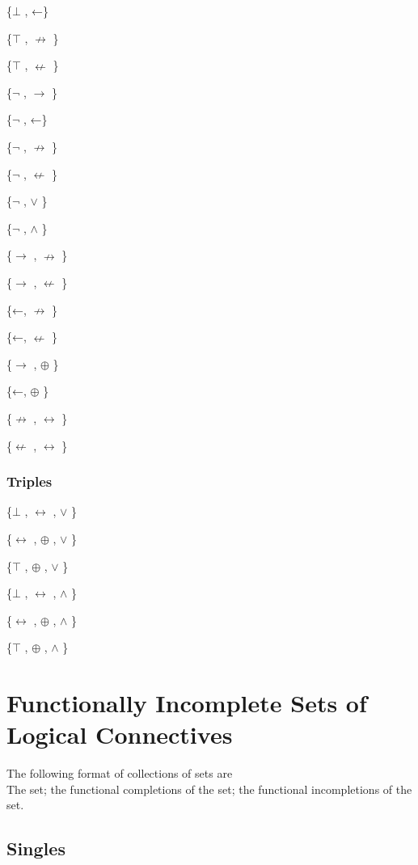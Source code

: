 \{$\bot$ , ←\}

\{$\top$ , $\nrightarrow$ \}

\{$\top$ , $\nleftarrow$ \}

\{$\neg$ , $\to$ \}

\{$\neg$ , ←\}

\{$\neg$ , $\nrightarrow$ \}

\{$\neg$ , $\nleftarrow$ \}

\{$\neg$ , $\lor$ \}

\{$\neg$ , $\land$ \}

\{$\to$ , $\nrightarrow$ \}

\{$\to$ , $\nleftarrow$ \}

\{←, $\nrightarrow$ \}

\{←, $\nleftarrow$ \}

\{$\to$ , $\oplus$ \}

\{←, $\oplus$ \}

\{$\nrightarrow$ , $\leftrightarrow$ \}

\{$\nleftarrow$ , $\leftrightarrow$ \}

\hypertarget{triples}{%
\subsubsection{Triples}\label{triples}}

\{$\bot$ , $\leftrightarrow$ , $\lor$ \}

\{$\leftrightarrow$ , $\oplus$ , $\lor$ \}

\{$\top$ , $\oplus$ , $\lor$ \}

\{$\bot$ , $\leftrightarrow$ , $\land$ \}

\{$\leftrightarrow$ , $\oplus$ , $\land$ \}

\{$\top$ , $\oplus$ , $\land$ \}

\hypertarget{functionally-incomplete-sets-of-logical-connectives}{%
\section{Functionally Incomplete Sets of Logical
Connectives}\label{functionally-incomplete-sets-of-logical-connectives}}

The following format of collections of sets are\\
The set; the functional completions of the set; the functional
incompletions of the set.

\hypertarget{singles-1}{%
\subsection{Singles}\label{singles-1}}

